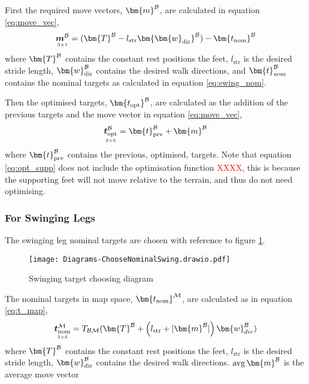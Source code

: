        \noindent
        First the required move vectors, \(\bm{m} ^\fbody\), are calculated in equation \ref{eq:move_vec},
        \begin{equation}\label{eq:move_vec}
            \mdim{\boldsymbol{m}^\fbody}{3}{1} =  (\bm{T}^\fbody - l_\text{str} \bm{\bm{w}_\text{dir}}^\fbody) - \bm{t_\text{nom}}^\fbody
        \end{equation}
        where \(\bm{T}^\fbody\) contains the constant rest positions the feet, \(l_\text{str}\) is the desired stride length, \(\bm{w}_\text{dir}^\fbody\)
        contains the desired walk directions, and \(\bm{t}_\text{nom} ^\fbody\) contains the nominal targets as calculated in
        equation \ref{eq:swing_nom}.

        Then the optimised targets, \(\bm{t_\text{opt}} ^\fbody\), are calculated as the addition of the previous targets and the move vector in equation \ref{eq:move_vec},
        \begin{equation} \label{eq:opt_supp}
            \mdim{\boldsymbol{t}_\text{opt}^\fbody}{3}{6} = \bm{t}_\text{prv}^\fbody + \bm{m}^\fbody
        \end{equation}
        where \(\bm{t}_\text{prv}^\fbody\) contains the previous, optimised, targets. Note that equation \ref{eq:opt_supp} does not include the optimisation
        function \textcolor{red}{XXXX}, this is because the supporting feet will not move relative to the terrain, and thus do not need optimising.

    \newpage
    \subsubsection{For Swinging Legs} \label{sec:swing}
        The swinging leg nominal targets are chosen with reference to figure \ref{fig:swinging_targ}.
        \begin{figure}[h]
            \centering
            \texttt{[image: Diagrams-ChooseNominalSwing.drawio.pdf]}
            \caption{Swinging target choosing diagram} 
            \label{fig:swinging_targ}
        \end{figure}

        \noindent
        The nominal targets in map space, \(\bm{t_\text{nom}} ^{\fmap}\), are calculated as in equation \ref{eq:t_map},
        \begin{equation} \label{eq:t_map}
            \mdim{\boldsymbol{t}_\text{nom}^{\fmap}}{3}{6} = \transframe{\bm{T}^\fbody + \left(l_\text{str}+|\bm{m}^\fbody|\right)\bm{w}_{dir}^\fbody}{\fbody}{\fmap}
        \end{equation}
        where \(\bm{T}^\fbody\) contains the constant rest positions the feet, \(l_\text{str}\) is the desired stride length, \(\bm{w}_\text{dir}^\fbody\)
        contains the desired walk directions. \(\avg\bm{m}^\fbody\) is the average move vector 

